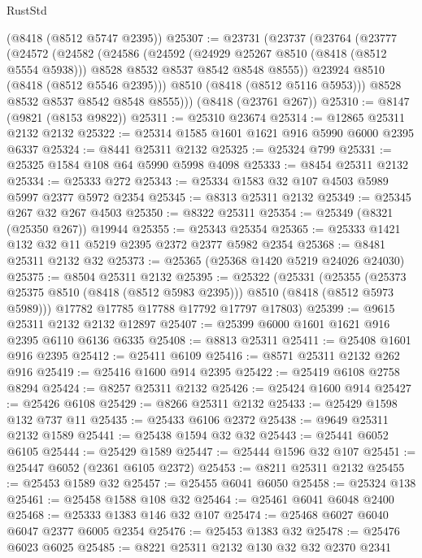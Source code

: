 \begin{lexlean}{RustStd}
\begin{coremodule}
    (@8418 (@8512 @5747 @2395))
@25307 := @23731
    (@23737
      (@23764
        (@23777
          (@24572
            (@24582
              (@24586
                (@24592
                  (@24929 @25267 @8510 (@8418 (@8512 @5554 @5938)))
                  @8528
                  @8532
                  @8537
                  @8542
                  @8548
                  @8555))
              @23924
              @8510
              (@8418 (@8512 @5546 @2395)))
            @8510
            (@8418 (@8512 @5116 @5953)))
          @8528
          @8532
          @8537
          @8542
          @8548
          @8555)))
    (@8418 (@23761 @267))
@25310 := @8147 (@9821 (@8153 @9822))
@25311 := @25310 @23674
@25314 := @12865 @25311 @2132 @2132
@25322 := @25314 @1585 @1601 @1621 @916 @5990 @6000 @2395 @6337
@25324 := @8441 @25311 @2132
@25325 := @25324 @799
@25331 := @25325 @1584 @108 @64 @5990 @5998 @4098
@25333 := @8454 @25311 @2132
@25334 := @25333 @272
@25343 := @25334 @1583 @32 @107 @4503 @5989 @5997 @2377 @5972 @2354
@25345 := @8313 @25311 @2132
@25349 := @25345 @267 @32 @267 @4503
@25350 := @8322 @25311
@25354 := @25349 (@8321 (@25350 @267)) @19944
@25355 := @25343 @25354
@25365 := @25333 @1421 @132 @32 @11 @5219 @2395 @2372 @2377 @5982 @2354
@25368 := @8481 @25311 @2132 @32
@25373 := @25365 (@25368 @1420 @5219 @24026 @24030)
@25375 := @8504 @25311 @2132
@25395 := @25322
    (@25331
      (@25355 (@25373 @25375 @8510 (@8418 (@8512 @5983 @2395))) @8510 (@8418 (@8512 @5973 @5989)))
      @17782
      @17785
      @17788
      @17792
      @17797
      @17803)
@25399 := @9615 @25311 @2132 @2132 @12897
@25407 := @25399 @6000 @1601 @1621 @916 @2395 @6110 @6136 @6335
@25408 := @8813 @25311
@25411 := @25408 @1601 @916 @2395
@25412 := @25411 @6109
@25416 := @8571 @25311 @2132 @262 @916
@25419 := @25416 @1600 @914 @2395
@25422 := @25419 @6108 @2758 @8294
@25424 := @8257 @25311 @2132
@25426 := @25424 @1600 @914
@25427 := @25426 @6108
@25429 := @8266 @25311 @2132
@25433 := @25429 @1598 @132 @737 @11
@25435 := @25433 @6106 @2372
@25438 := @9649 @25311 @2132 @1589
@25441 := @25438 @1594 @32 @32
@25443 := @25441 @6052 @6105
@25444 := @25429 @1589
@25447 := @25444 @1596 @32 @107
@25451 := @25447 @6052 (@2361 @6105 @2372)
@25453 := @8211 @25311 @2132
@25455 := @25453 @1589 @32
@25457 := @25455 @6041 @6050
@25458 := @25324 @138
@25461 := @25458 @1588 @108 @32
@25464 := @25461 @6041 @6048 @2400
@25468 := @25333 @1383 @146 @32 @107
@25474 := @25468 @6027 @6040 @6047 @2377 @6005 @2354
@25476 := @25453 @1383 @32
@25478 := @25476 @6023 @6025
@25485 := @8221 @25311 @2132 @130 @32 @32 @2370 @2341

\end{coremodule}
\end{lexlean}
